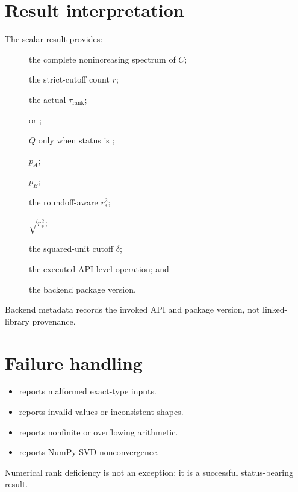 \section{Result interpretation}
The scalar result provides:
\begin{description}
  \item[] the complete nonincreasing spectrum of $C$;
  \item[] the strict-cutoff count $r$;
  \item[] the actual $\tau_{\mathrm{rank}}$;
  \item[]  or ;
  \item[] $Q$ only when status is ;
  \item[] $p_A$;
  \item[] $p_B$;
  \item[] the roundoff-aware $r_*^2$;
  \item[] $\sqrt{r_*^2}$;
  \item[] the squared-unit cutoff $\delta$;
  \item[] the executed API-level operation; and
  \item[] the backend package version.
\end{description}
Backend metadata records the invoked API and package version, not linked-library
provenance.

\section{Failure handling}
\begin{itemize}
  \item {} reports malformed exact-type inputs.
  \item {} reports invalid values or inconsistent shapes.
  \item {} reports nonfinite or overflowing arithmetic.
  \item {} reports NumPy SVD nonconvergence.
\end{itemize}
Numerical rank deficiency is not an exception: it is a successful status-bearing result.
